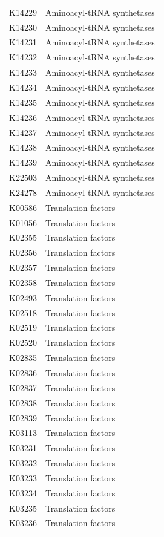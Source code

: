 \begin{longtable}{@{}l l@{}}
K14229 & Aminoacyl-tRNA synthetases \\
K14230 & Aminoacyl-tRNA synthetases \\
K14231 & Aminoacyl-tRNA synthetases \\
K14232 & Aminoacyl-tRNA synthetases \\
K14233 & Aminoacyl-tRNA synthetases \\
K14234 & Aminoacyl-tRNA synthetases \\
K14235 & Aminoacyl-tRNA synthetases \\
K14236 & Aminoacyl-tRNA synthetases \\
K14237 & Aminoacyl-tRNA synthetases \\
K14238 & Aminoacyl-tRNA synthetases \\
K14239 & Aminoacyl-tRNA synthetases \\
K22503 & Aminoacyl-tRNA synthetases \\
K24278 & Aminoacyl-tRNA synthetases \\
K00586 & Translation factors \\
K01056 & Translation factors \\
K02355 & Translation factors \\
K02356 & Translation factors \\
K02357 & Translation factors \\
K02358 & Translation factors \\
K02493 & Translation factors \\
K02518 & Translation factors \\
K02519 & Translation factors \\
K02520 & Translation factors \\
K02835 & Translation factors \\
K02836 & Translation factors \\
K02837 & Translation factors \\
K02838 & Translation factors \\
K02839 & Translation factors \\
K03113 & Translation factors \\
K03231 & Translation factors \\
K03232 & Translation factors \\
K03233 & Translation factors \\
K03234 & Translation factors \\
K03235 & Translation factors \\
K03236 & Translation factors \\

\end{longtable}

